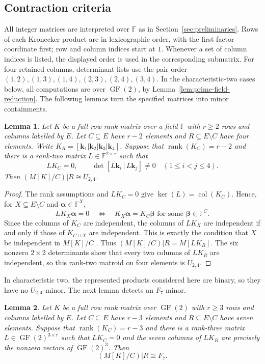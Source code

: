 \documentclass[12pt,a4paper]{article}
\numberwithin{equation}{section}
\DeclareMathOperator{\rank}{rank}
\DeclareMathOperator{\col}{col}
\newcommand{\F}{\mathbb F}
\newtheorem{lemma}[lemma]{Lemma}
\theoremstyle{definition}
\theoremstyle{remark}
\begin{document}
\subsection{Contraction criteria}
All integer matrices are interpreted over \(\F\) as in
Section~\ref{sec:preliminaries}.  Rows of each Kronecker product
are in lexicographic order, with the first factor coordinate first;
row and column indices start at \(1\).  Whenever a set of column
indices is listed, the displayed order is used in the corresponding
submatrix.
For four retained columns, determinant lists use the pair order
\((1,2),(1,3),(1,4),(2,3),(2,4),(3,4)\).
In the characteristic-two cases below, all computations are over
\(\operatorname{GF}(2)\), by Lemma~\ref{lem:prime-field-reduction}.
The following lemmas turn the specified matrices into minor containments.
\begin{lemma}
\label{prop:u24-contraction}
Let \(K\) be a full row rank matrix over a field \(\F\) with
\(r\ge2\) rows and columns labelled by \(E\).  Let
\(C\subseteq E\) have \(r-2\) elements and
\(R\subseteq E\setminus C\) have four elements.  Write
\(K_R=[\boldsymbol{k}_1|\boldsymbol{k}_2|\boldsymbol{k}_3|\boldsymbol{k}_4]\).
Suppose that \(\rank(K_C)=r-2\) and there is a rank-two matrix
\(L\in\F^{2\times r}\) such that
\[
LK_C=0,\qquad \det[L\boldsymbol{k}_i\,|\,L\boldsymbol{k}_j]\ne0
\quad(1\le i<j\le4).
\]
Then \((M[K]/C)|R\cong U_{2,4}\).
\end{lemma}
\begin{proof}
The rank assumptions and \(LK_C=0\) give
\(\ker(L)=\col(K_C)\).  Hence, for \(X\subseteq E\setminus C\)
and \(\boldsymbol\alpha\in\F^X\),
\[
 LK_X\boldsymbol\alpha=0
 \quad\Longleftrightarrow\quad
 K_X\boldsymbol\alpha=K_C\boldsymbol\beta
 \text{ for some }\boldsymbol\beta\in\F^C.
\]
Since the columns of \(K_C\) are independent, the columns of
\(LK_X\) are independent if and only if those of \(K_{C\cup X}\)
are independent.  This is exactly the condition that \(X\) be
independent in \(M[K]/C\)
\cite[Proposition~3.1.7]{oxley}.  Thus
\((M[K]/C)|R=M[LK_R]\).
The six nonzero \(2\times2\) determinants show that every two
columns of \(LK_R\) are independent, so this rank-two matroid
on four elements is \(U_{2,4}\).
\end{proof}
In characteristic two, the represented products considered here
are binary, so they have no \(U_{2,4}\)-minor.  The next lemma
detects an \(F_7\)-minor.
\begin{lemma}
\label{prop:f7-contraction}
Let \(K\) be a full row rank matrix over \(\operatorname{GF}(2)\)
with \(r\ge3\) rows and columns labelled by \(E\).  Let
\(C\subseteq E\) have \(r-3\) elements and
\(R\subseteq E\setminus C\) have seven elements.  Suppose that
\(\rank(K_C)=r-3\) and there is a rank-three matrix
\(L\in\operatorname{GF}(2)^{3\times r}\) such that \(LK_C=0\)
and the seven columns of \(LK_R\) are precisely the nonzero vectors
of \(\operatorname{GF}(2)^3\).  Then
\[
 (M[K]/C)|R\cong F_7.
\]
\end{lemma}
\end{document}
